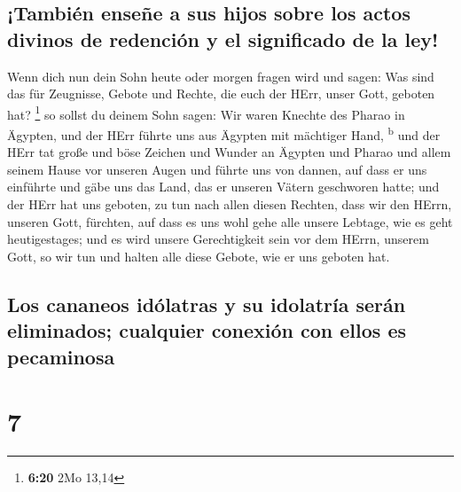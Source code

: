 \hypertarget{tambiuxe9n-enseuxf1e-a-sus-hijos-sobre-los-actos-divinos-de-redenciuxf3n-y-el-significado-de-la-ley}{%
\subsection{¡También enseñe a sus hijos sobre los actos divinos de
redención y el significado de la
ley!}\label{tambiuxe9n-enseuxf1e-a-sus-hijos-sobre-los-actos-divinos-de-redenciuxf3n-y-el-significado-de-la-ley}}

 Wenn dich nun dein Sohn heute oder morgen fragen wird
und sagen: Was sind das für Zeugnisse, Gebote und Rechte, die euch der
HErr, unser Gott, geboten hat? \footnote{\textbf{6:20} 2Mo 13,14}
 so sollst du deinem Sohn sagen: Wir waren Knechte des
Pharao in Ägypten, und der HErr führte uns aus Ägypten mit mächtiger
Hand, \textsuperscript{b}  und der HErr tat große und
böse Zeichen und Wunder an Ägypten und Pharao und allem seinem Hause vor
unseren Augen  und führte uns von dannen, auf dass er uns
einführte und gäbe uns das Land, das er unseren Vätern geschworen hatte;
 und der HErr hat uns geboten, zu tun nach allen diesen
Rechten, dass wir den HErrn, unseren Gott, fürchten, auf dass es uns
wohl gehe alle unsere Lebtage, wie es geht heutigestages;
 und es wird unsere Gerechtigkeit sein vor dem HErrn,
unserem Gott, so wir tun und halten alle diese Gebote, wie er uns
geboten hat.

\hypertarget{los-cananeos-iduxf3latras-y-su-idolatruxeda-seruxe1n-eliminados-cualquier-conexiuxf3n-con-ellos-es-pecaminosa}{%
\subsection{Los cananeos idólatras y su idolatría serán eliminados;
cualquier conexión con ellos es
pecaminosa}\label{los-cananeos-iduxf3latras-y-su-idolatruxeda-seruxe1n-eliminados-cualquier-conexiuxf3n-con-ellos-es-pecaminosa}}

\hypertarget{section-6}{%
\section{7}\label{section-6}}

